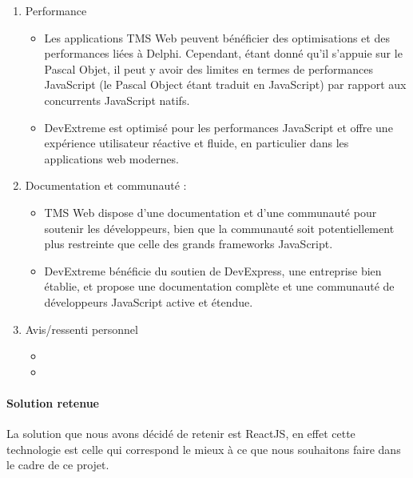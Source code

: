 \documentclass[a4paper, 12pt, french]{article}
\newcommand{\bdot}{\item[\color{ssiYellow}\ding{108}]}
\begin{document}
\begin{enumerate}
								\item Performance
									\begin{itemize}
										\bdot{Les applications TMS Web peuvent bénéficier des optimisations et des performances liées à Delphi. Cependant, étant donné qu'il s'appuie sur le Pascal Objet, il peut y avoir des limites en termes de performances JavaScript (le Pascal Object étant traduit en JavaScript) par rapport aux concurrents JavaScript natifs.}
										\bdot{DevExtreme est optimisé pour les performances JavaScript et offre une expérience utilisateur réactive et fluide, en particulier dans les applications web modernes.}
									\end{itemize}

								\item Documentation et communauté :
									\begin{itemize}
										\bdot{TMS Web dispose d'une documentation et d'une communauté pour soutenir les développeurs, bien que la communauté soit potentiellement plus restreinte que celle des grands frameworks JavaScript.}
										\bdot{DevExtreme bénéficie du soutien de DevExpress, une entreprise bien établie, et propose une documentation complète et une communauté de développeurs JavaScript active et étendue.}
									\end{itemize}
		
								\item Avis/ressenti personnel
									\begin{itemize}
										\bdot{}
										\bdot{}
									\end{itemize}
							\end{enumerate}

		
		
						\paragraph{Solution retenue}
							La solution que nous avons décidé de retenir est ReactJS, en effet cette technologie est celle qui correspond le mieux à ce que nous souhaitons faire dans le cadre de ce projet.
\end{document}
